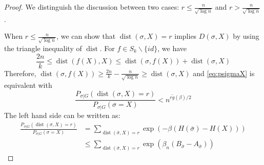 \documentclass[journal]{IEEEtran}
\newcommand{\1}{\mathbbm{1}}
\DeclareMathOperator{\dist}{dist}
\begin{document}
\begin{proof}
We distinguish the discussion between two cases: $r\leq \frac{n}{\sqrt{\log n}}$
and $r > \frac{n}{\sqrt{\log n}}$.

When $r\leq \frac{n}{\sqrt{\log n}}$, we can show that $\dist(\sigma, X) = r$ implies $D(\sigma, X)$ by using the triangle
inequality of $\dist$. For $f \in S_k \backslash \{ id \}$, we have
$$
\frac{2n}{k} \leq \dist(f(X), X) \leq \dist(\sigma, f(X)) + \dist(\sigma, X)
$$
Therefore, $\dist(\sigma, f(X)) \geq \frac{2n}{k} - \frac{n}{\sqrt{\log n}} \geq \dist(\sigma, X)$ and
\eqref{eq:psigmaX} is equivalent with
\begin{equation}\label{eq:psigmaX2}
\frac{P_{\sigma|G}(\dist(\sigma, X)=r)}
{P_{\sigma|G}(\sigma=X)} <
n^{r \tilde{g}(\beta) /2}
\end{equation}
The left hand side can be written as:
\begin{align*}
\frac{P_{\sigma|G}(\dist(\sigma, X)=r)}
{P_{\sigma|G}(\sigma=X)}  &= \sum_{\dist(\bar{\sigma}, X)=r}\exp(-\beta(H(\bar{\sigma})-H(X)))\\
&\leq \sum_{\dist(\bar{\sigma}, X)=r}\exp(\beta_n(B_{\bar{\sigma}}-A_{\bar{\sigma}}))
\end{align*}



\end{proof}
\end{document}

